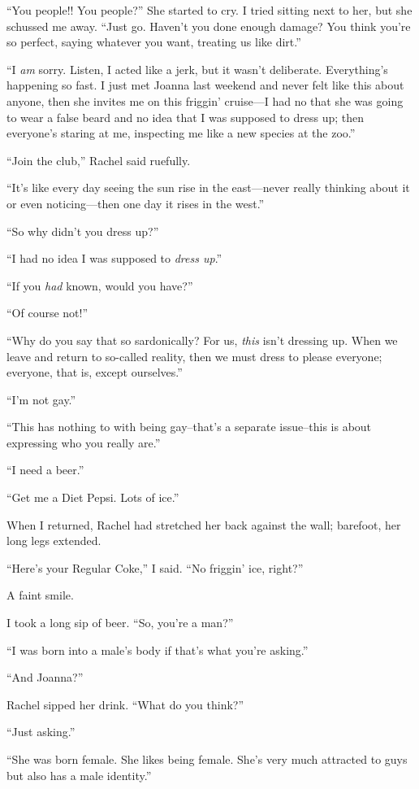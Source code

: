 ``You people!! You people?'' She started to cry. I tried sitting next to
her, but she schussed me away. ``Just go. Haven't you done enough
damage? You think you're so perfect, saying whatever you want, treating
us like dirt.''

``I \emph{am} sorry. Listen, I acted like a jerk, but it wasn't
deliberate. Everything's happening so fast. I just met Joanna last
weekend and never felt like this about anyone, then she invites me on
this friggin' cruise---I had no that she was going to wear a false beard
and no idea that I was supposed to dress up; then everyone's staring at
me, inspecting me like a new species at the zoo.''

``Join the club,'' Rachel said ruefully.

``It's like every day seeing the sun rise in the east---never really
thinking about it or even noticing---then one day it rises in the
west.''

``So why didn't you dress up?''

``I had no idea I was supposed to \emph{dress up}.''

``If you \emph{had} known, would you have?''

``Of course not!''

``Why do you say that so sardonically? For us, \emph{this} isn't
dressing up. When we leave and return to so-called reality, then we must
dress to please everyone; everyone, that is, except ourselves.''

``I'm not gay.''

``This has nothing to with being gay--that's a separate issue--this is
about expressing who you really are.''

``I need a beer.''

``Get me a Diet Pepsi. Lots of ice.''

When I returned, Rachel had stretched her back against the wall;
barefoot, her long legs extended.

``Here's your Regular Coke,'' I said. ``No friggin' ice, right?''

A faint smile.

I took a long sip of beer. ``So, you're a man?''

``I was born into a male's body if that's what you're asking.''

``And Joanna?''

Rachel sipped her drink. ``What do you think?''

``Just asking.''

``She was born female. She likes being female. She's very much attracted
to guys but also has a male identity.''

